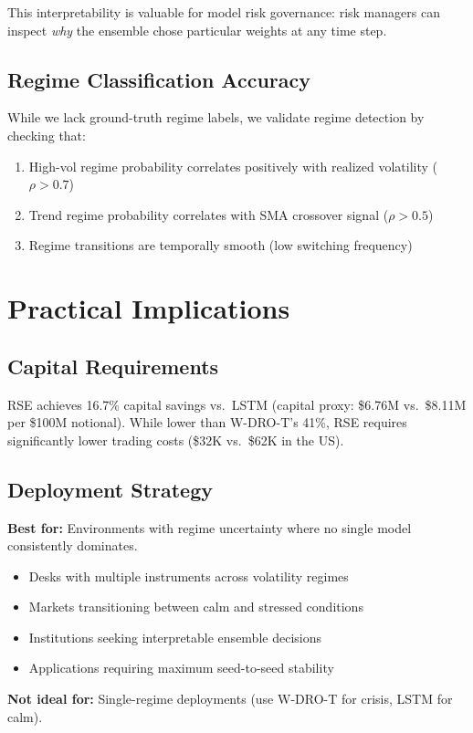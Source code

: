 \documentclass[11pt]{article}
\begin{document}
This interpretability is valuable for model risk governance: risk managers can inspect \emph{why} the ensemble chose particular weights at any time step.

\subsection{Regime Classification Accuracy}

While we lack ground-truth regime labels, we validate regime detection by checking that:
\begin{enumerate}[noitemsep]
    \item High-vol regime probability correlates positively with realized volatility ($\rho > 0.7$)
    \item Trend regime probability correlates with SMA crossover signal ($\rho > 0.5$)
    \item Regime transitions are temporally smooth (low switching frequency)
\end{enumerate}

\section{Practical Implications}
\label{sec:implications}

\subsection{Capital Requirements}

RSE achieves 16.7\% capital savings vs.\ LSTM (capital proxy: \$6.76M vs.\ \$8.11M per \$100M notional). While lower than W-DRO-T's 41\%, RSE requires significantly lower trading costs (\$32K vs.\ \$62K in the US).

\subsection{Deployment Strategy}

\begin{tcolorbox}[title=RSE Deployment Guidance]
\textbf{Best for:} Environments with regime uncertainty where no single model consistently dominates.
\begin{itemize}[noitemsep]
    \item Desks with multiple instruments across volatility regimes
    \item Markets transitioning between calm and stressed conditions
    \item Institutions seeking interpretable ensemble decisions
    \item Applications requiring maximum seed-to-seed stability
\end{itemize}
\textbf{Not ideal for:} Single-regime deployments (use W-DRO-T for crisis, LSTM for calm).
\end{tcolorbox}
\end{document}
